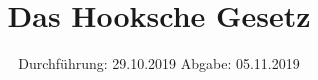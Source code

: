 

\subject{802}
\title{Das Hooksche Gesetz}
\date{%
  Durchführung: 29.10.2019
  \hspace{3em}
  Abgabe: 05.11.2019
}



\maketitle
\thispagestyle{empty}
\tableofcontents
\newpage

\printbibliography{}


